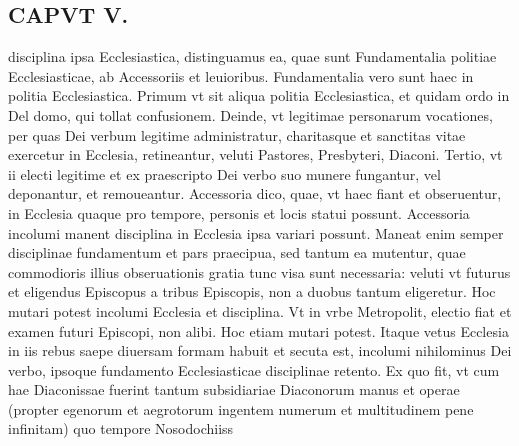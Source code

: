\documentclass{article}
\begin{document}
\begin{pages}
\section*{CAPVT  V. }
\marginpar{[ p.289 ]}\pstart disciplina ipsa Ecclesiastica, distinguamus ea, quae sunt Fundamentalia politiae Ecclesiasticae, ab Accessoriis et leuioribus. Fundamentalia vero sunt haec in politia Ecclesiastica. Primum vt sit aliqua politia Ecclesiastica, et quidam ordo in Del domo, qui tollat confusionem. Deinde, vt legitimae personarum vocationes, per quas Dei verbum legitime administratur, charitasque et sanctitas vitae exercetur in Ecclesia, retineantur, veluti Pastores, Presbyteri, Diaconi. Tertio, vt ii electi legitime et ex praescripto Dei verbo suo munere fungantur, vel deponantur, et remoueantur. Accessoria dico, quae, vt haec fiant et obseruentur, in Ecclesia quaque pro tempore, personis et locis statui possunt. Accessoria incolumi manent disciplina in Ecclesia ipsa variari possunt. Maneat enim semper disciplinae fundamentum et pars praecipua, sed tantum ea mutentur, quae commodioris illius obseruationis gratia tunc visa sunt necessaria: veluti vt futurus et eligendus Episcopus a tribus Episcopis, non a duobus tantum eligeretur. Hoc mutari potest incolumi Ecclesia et disciplina. Vt in vrbe Metropolit, electio fiat et examen futuri Episcopi, non alibi. Hoc etiam mutari potest. Itaque vetus Ecclesia in iis rebus saepe diuersam formam habuit et secuta est, incolumi nihilominus Dei verbo, ipsoque fundamento Ecclesiasticae disciplinae retento. Ex quo fit, vt cum hae Diaconissae fuerint tantum subsidiariae Diaconorum manus et operae (propter egenorum et aegrotorum ingentem numerum et multitudinem pene infinitam) quo tempore Nosodochiiss  \pend

\end{pages}
\end{document}

